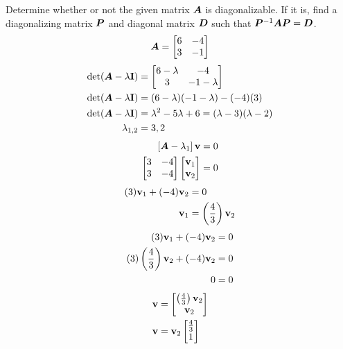 \documentclass{article}
\begin{document}
Determine whether or not the given matrix $ \bm{A} $ is diagonalizable. If it is, find a diagonalizing matrix $ \bm{P} $ and diagonal matrix $ \bm{D} $ such that $ \bm{P}^{-1}\bm{A}\bm{P} = \bm{D} $.
\begin{equation*}
	\bm{A} =
		\begin{bmatrix}
			6 & -4 \\
			3 & -1
		\end{bmatrix}
\end{equation*}
\begin{align*}
	\det( \matr{A} - \lambda \vect{I} ) & =
		\begin{bmatrix}
			6 - \lambda & -4 \\
			3 & -1 - \lambda
		\end{bmatrix} \\
	\det( \matr{A} - \lambda \vect{I} ) & = (6 - \lambda)(-1 - \lambda) - (-4)(3) \\
	\det( \matr{A} - \lambda \vect{I} ) & = \lambda^2 - 5\lambda + 6 = (\lambda - 3)(\lambda - 2) \\
	\lambda_{1,2} & = 3, 2
\end{align*}
\begin{align*}
	\left[ \matr{A} - \lambda_1 \right] \vect{v} & = 0 \\
	\begin{bmatrix}
		3 & -4 \\
		3 & -4
	\end{bmatrix}
	\begin{bmatrix} \vect{v}_1 \\ \vect{v}_2 \end{bmatrix} & = 0
\end{align*}
\begin{align*}
	(3)\vect{v}_1 + (-4)\vect{v}_2 & = 0 \\
	\vect{v}_1 & = \left( \frac{4}{3} \right) \vect{v}_2
\end{align*}
\begin{align*}
	(3)\vect{v}_1 + (-4)\vect{v}_2 & = 0 \\
	(3) \left( \frac{4}{3} \right) \vect{v}_2 + (-4)\vect{v}_2 & = 0 \\
	0 & = 0
\end{align*}
\begin{align*}
	\vect{v} & =
		\begin{bmatrix}
			\left( \frac{4}{3} \right) \vect{v}_2 \\
			\vect{v}_2
		\end{bmatrix} \\
	\vect{v} & =
		\vect{v}_2 \begin{bmatrix}
			\frac{4}{3} \\
			1
		\end{bmatrix}
\end{align*}
\end{document}
